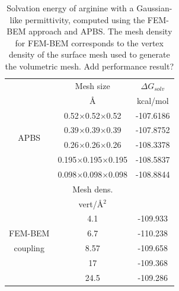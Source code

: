 \begin{table}
\centering
\begin{tabular}{c|c|c}
&Mesh size & $\Delta G_{solv}$\\
&\AA       &  kcal/mol \\
\hline
\multirow{4}{*}{APBS}& 0.52$\times$0.52$\times$0.52 & -107.6186 \\ 
& 0.39$\times$0.39$\times$0.39 & -107.8752\\ 
&0.26$\times$0.26$\times$0.26 & -108.3378\\ 
&0.195$\times$0.195$\times$0.195 & -108.5837\\ 
&0.098$\times$0.098$\times$0.098 & -108.8844\\ 
\hline
&Mesh dens. & \\
&vert/\AA$^2$ & \\
\hline
    & 4.1 & -109.933 \\
FEM-BEM    & 6.7  & -110.238 \\
coupling    & 8.57  & -109.658 \\
    & 17 & -109.368 \\
    & 24.5 & -109.286 \\
\hline
\end{tabular}
\caption{Solvation energy of arginine with a Gaussian-like permittivity, computed using the FEM-BEM approach and APBS. The mesh density for FEM-BEM corresponds to the vertex density of the surface mesh used to generate the volumetric mesh. Add performance result?}
\label{table:arg2_variable}
\end{table}



